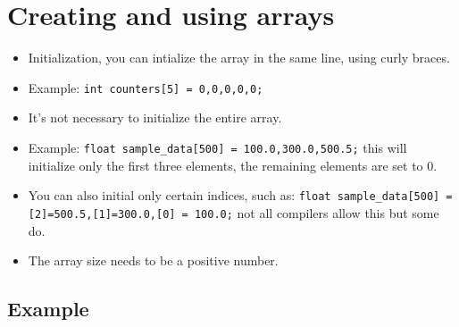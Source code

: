 \section{Creating and using arrays}
\begin{itemize}
    \item Initialization, you can intialize the array in the same line, using curly braces. 
    \item Example: \texttt{int counters[5] = {0,0,0,0,0};}
    \item It's not necessary to initialize the entire array. 
    \item Example: \texttt{float sample_data[500] = {100.0,300.0,500.5};} this will initialize only the first three elements, the remaining elements are set to 0. 
    \item You can also initial only certain indices, such as: \texttt{float sample_data[500] = {[2]=500.5,[1]=300.0,[0] = 100.0};} not all compilers allow this but some do. 
    \item The array size needs to be a positive number. 
\end{itemize}
\subsection{Example}


